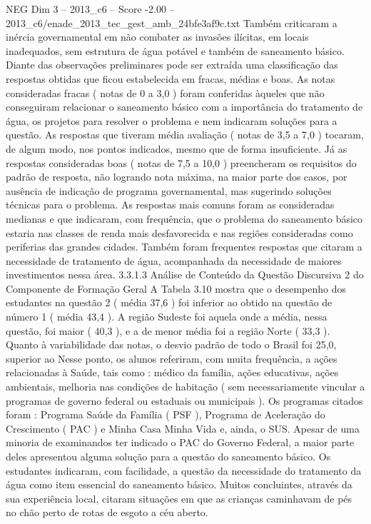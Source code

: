 \begin{textsample}{NEG Dim 3 – 2013\_c6 – Score -2.00 – 2013\_c6/enade\_2013\_tec\_gest\_amb\_24bfe3af9c.txt}
Também criticaram a inércia governamental em não combater as invasões ilícitas, em locais inadequados, sem estrutura de água potável e também de saneamento básico.
Diante das observações preliminares pode ser extraída uma classificação das respostas obtidas que ficou estabelecida em fracas, médias e boas.
As notas consideradas fracas ( notas de 0 a 3,0 ) foram conferidas àqueles que não conseguiram relacionar o saneamento básico com a importância do tratamento de água, os projetos para resolver o problema e nem indicaram soluções para a questão.
As respostas que tiveram média avaliação ( notas de 3,5 a 7,0 ) tocaram, de algum modo, nos pontos indicados, mesmo que de forma insuficiente.
Já as respostas consideradas boas ( notas de 7,5 a 10,0 ) preencheram os requisitos do padrão de resposta, não logrando nota máxima, na maior parte dos casos, por ausência de indicação de programa governamental, mas sugerindo soluções técnicas para o problema.
As respostas mais comuns foram as consideradas medianas e que indicaram, com frequência, que o problema do saneamento básico estaria nas classes de renda mais desfavorecida e nas regiões consideradas como periferias das grandes cidades.
Também foram frequentes respostas que citaram a necessidade de tratamento de água, acompanhada da necessidade de maiores investimentos nessa área. 3.3.1.3 Análise de Conteúdo da Questão Discursiva 2 do Componente de Formação Geral A Tabela 3.10 mostra que o desempenho dos estudantes na questão 2 ( média 37,6 ) foi inferior ao obtido na questão de número 1 ( média 43,4 ).
A região Sudeste foi aquela onde a média, nessa questão, foi maior ( 40,3 ), e a de menor média foi a região Norte ( 33,3 ).
Quanto à variabilidade das notas, o desvio padrão de todo o Brasil foi 25,0, superior ao Nesse ponto, os alunos referiram, com muita frequência, a ações relacionadas à Saúde, tais como : médico da família, ações educativas, ações ambientais, melhoria nas condições de habitação ( sem necessariamente vincular a programas de governo federal ou estaduais ou municipais ).
Os programas citados foram : Programa Saúde da Família ( PSF ), Programa de Aceleração do Crescimento ( PAC ) e Minha Casa Minha Vida e, ainda, o SUS.
Apesar de uma minoria de examinandos ter indicado o PAC do Governo Federal, a maior parte deles apresentou alguma solução para a questão do saneamento básico.
Os estudantes indicaram, com facilidade, a questão da necessidade do tratamento da água como item essencial do saneamento básico.
Muitos concluintes, através da sua experiência local, citaram situações em que as crianças caminhavam de pés no chão perto de rotas de esgoto a céu aberto.

\end{textsample}
